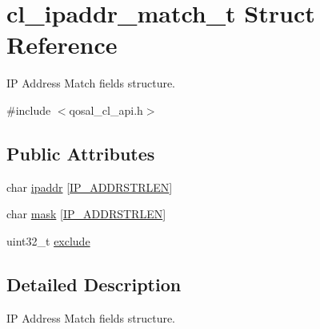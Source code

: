 \hypertarget{structcl__ipaddr__match__t}{\section{cl\-\_\-ipaddr\-\_\-match\-\_\-t Struct Reference}
\label{structcl__ipaddr__match__t}
}


I\-P Address Match fields structure.  




{\ttfamily \#include $<$qosal\-\_\-cl\-\_\-api.\-h$>$}

\subsection*{Public Attributes}
\begin{DoxyCompactItemize}
\item 
char \hyperlink{structcl__ipaddr__match__t_a3579a408f626c12e0e7187b68a599d8e}{ipaddr} \mbox{[}\hyperlink{group__FAPI__QOS__CLASS_ga684323e1ca3c7464366255d8ab239c18}{I\-P\-\_\-\-A\-D\-D\-R\-S\-T\-R\-L\-E\-N}\mbox{]}
\item 
char \hyperlink{structcl__ipaddr__match__t_af1c611cf5751752aac9df3b4451436f0}{mask} \mbox{[}\hyperlink{group__FAPI__QOS__CLASS_ga684323e1ca3c7464366255d8ab239c18}{I\-P\-\_\-\-A\-D\-D\-R\-S\-T\-R\-L\-E\-N}\mbox{]}
\item 
uint32\-\_\-t \hyperlink{structcl__ipaddr__match__t_a6a25abdb21cb01ef165f545730b69547}{exclude}
\end{DoxyCompactItemize}


\subsection{Detailed Description}
I\-P Address Match fields structure. 

